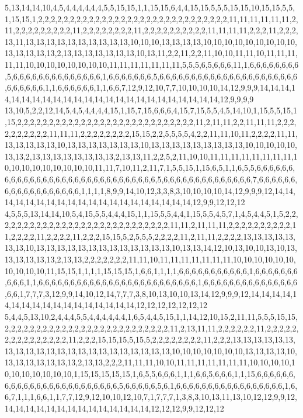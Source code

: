 5,13,14,14,10,4,5,4,4,4,4,4,4,5,5,15,15,1,1,15,15,6,4,4,15,15,5,5,5,15,15,10,15,15,5,5,1,15,15,1,2,2,2,2,2,2,2,2,2,2,2,2,2,2,2,2,2,2,2,2,2,2,2,2,2,2,2,2,2,2,11,11,11,11,11,11,2,11,2,2,2,2,2,2,2,2,2,11,2,2,2,2,2,2,2,2,11,2,2,2,2,2,2,2,2,2,2,11,11,11,11,2,2,2,11,2,2,2,13,11,13,13,13,13,13,13,13,13,13,13,10,10,10,13,13,13,13,10,10,10,10,10,10,10,10,10,13,13,13,13,13,2,13,13,13,13,13,13,13,10,13,11,2,2,11,2,2,11,10,10,11,11,10,11,11,11,11,11,10,10,10,10,10,10,10,10,11,11,11,11,11,11,11,5,5,5,6,5,6,6,6,11,1,6,6,6,6,6,6,6,6,5,6,6,6,6,6,6,6,6,6,6,6,6,6,6,1,6,6,6,6,6,6,6,5,6,6,6,6,6,6,6,6,6,6,6,6,6,6,6,6,6,6,6,6,6,6,6,6,6,6,6,6,1,1,6,6,6,6,6,6,1,1,6,6,7,12,9,12,10,7,7,10,10,10,10,14,12,9,9,9,14,14,14,14,14,14,14,14,14,14,14,14,14,14,14,14,14,14,14,14,14,14,14,14,12,9,9,9,9
13,10,5,2,2,12,14,5,4,5,4,4,4,4,15,1,15,7,15,6,6,6,4,15,7,15,5,5,4,5,14,10,1,15,5,5,15,1,15,2,2,2,2,2,2,2,2,2,2,2,2,2,2,2,2,2,2,2,2,2,2,2,2,2,2,2,2,11,2,11,11,2,2,11,11,11,2,2,2,2,2,2,2,2,2,2,11,11,11,2,2,2,2,2,2,2,2,15,15,2,2,5,5,5,5,4,2,2,11,11,10,11,2,2,2,2,11,11,13,13,13,13,13,10,13,13,13,13,13,13,13,10,13,13,13,13,13,13,13,13,13,10,10,10,10,10,13,13,2,13,13,13,13,13,13,13,13,2,13,13,11,2,2,5,2,11,10,10,11,11,11,11,11,11,11,11,10,10,10,10,10,10,10,10,10,11,11,7,10,11,2,11,7,1,5,5,15,1,15,6,5,1,1,6,5,5,6,6,6,6,6,6,6,6,6,6,6,6,6,6,6,6,6,6,6,6,6,6,6,6,6,6,6,6,6,6,5,6,6,6,6,6,6,6,6,6,6,6,6,6,6,7,6,6,6,6,6,6,6,6,6,6,6,6,6,6,6,6,6,6,1,1,1,1,8,9,9,14,10,12,3,3,8,3,10,10,10,10,14,12,9,9,9,12,14,14,14,14,14,14,14,14,14,14,14,14,14,14,14,14,14,14,14,14,12,9,9,12,12,12
4,5,5,5,13,14,14,10,5,4,15,5,5,4,4,4,15,1,1,15,5,5,4,4,1,15,5,5,4,5,7,1,4,5,4,4,5,1,5,2,2,2,2,2,2,2,2,2,2,2,2,2,2,2,2,2,2,2,2,2,2,2,2,2,2,2,2,11,11,2,11,11,11,2,2,2,2,2,2,2,2,2,2,11,2,2,2,2,11,2,2,2,2,11,2,2,2,15,15,5,2,5,5,5,2,2,2,2,11,2,11,11,2,2,2,2,13,13,13,13,13,13,13,10,13,13,13,13,13,13,13,13,13,13,13,13,13,10,13,13,14,12,10,13,10,10,13,10,13,13,13,13,13,13,2,13,13,2,2,2,2,2,2,2,11,11,10,11,11,11,11,11,11,11,10,10,10,10,10,10,10,10,10,10,11,15,15,1,1,1,1,15,15,15,1,6,6,1,1,1,1,6,6,6,6,6,6,6,6,6,6,6,1,6,6,6,6,6,6,6,6,6,6,1,1,6,6,6,6,6,6,6,6,6,6,6,6,6,6,6,6,6,6,6,6,6,6,6,6,6,1,6,6,6,6,6,6,6,6,6,6,6,6,6,6,6,6,6,1,7,7,7,3,12,9,9,14,10,12,14,7,7,7,3,8,10,13,10,10,13,14,12,9,9,9,12,14,14,14,14,14,14,14,14,14,14,14,14,14,14,14,14,14,12,12,12,12,12,12,12
5,4,4,5,13,10,2,4,4,4,5,5,4,4,4,4,4,4,1,6,5,4,4,5,15,1,1,14,12,10,15,2,11,11,5,5,5,15,15,2,2,2,2,2,2,2,2,2,2,2,2,2,2,2,2,2,2,2,2,2,2,2,2,2,2,11,2,13,11,11,2,2,2,2,2,2,11,2,2,2,2,2,2,2,2,2,2,2,2,2,2,2,11,2,2,2,15,15,15,5,15,5,2,2,2,2,2,2,2,2,11,2,2,2,13,13,13,13,13,13,13,13,13,13,13,13,13,13,13,13,13,13,13,13,13,13,10,10,10,10,10,10,10,13,13,13,13,10,13,13,13,13,13,13,13,2,13,13,2,2,2,11,11,11,10,10,11,11,11,11,11,11,11,10,10,10,10,10,10,10,10,10,10,10,1,15,15,15,15,15,1,6,5,5,6,6,6,1,1,1,6,6,5,6,6,6,1,1,15,6,6,6,6,6,6,6,6,6,6,6,6,6,6,6,6,6,6,6,6,6,6,6,6,5,6,6,6,6,6,5,6,1,6,6,6,6,6,6,6,6,6,6,6,6,6,6,6,6,6,1,6,6,7,1,1,1,6,6,1,1,7,7,12,9,12,10,10,12,10,7,1,7,7,7,1,3,8,3,10,13,11,13,10,12,12,9,9,12,14,14,14,14,14,14,14,14,14,14,14,14,14,14,12,12,12,9,9,12,12,12
